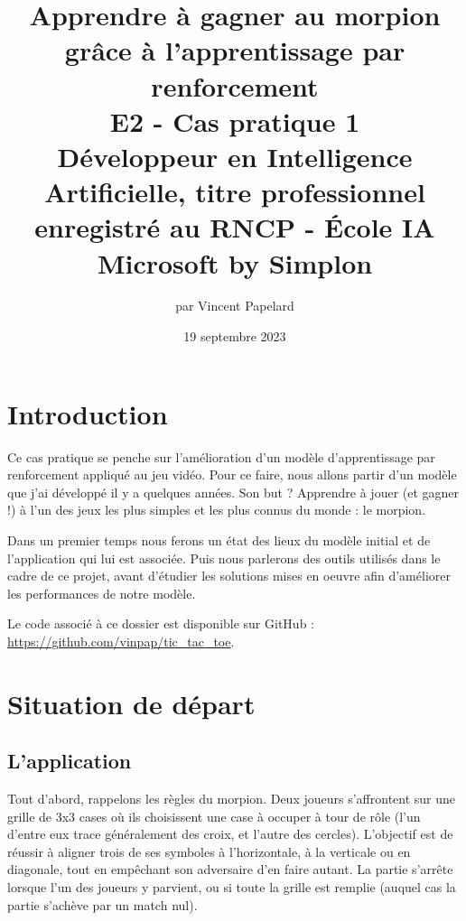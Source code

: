 \documentclass[french]{article}
\title{%
    \huge Apprendre à gagner au morpion grâce à l'apprentissage par renforcement  \\
    \bigskip
    \large E2 - Cas pratique 1 \\ 
    Développeur en Intelligence Artificielle,
    titre professionnel enregistré au RNCP - École IA Microsoft by Simplon}
\date{19 septembre 2023}
\author{par Vincent Papelard}
\begin{document}
    \maketitle
    \newpage
    \tableofcontents
    \newpage

    \section*{Introduction}
    Ce cas pratique se penche sur l'amélioration d'un modèle d'apprentissage par renforcement appliqué au jeu vidéo. Pour ce faire, nous allons partir d'un modèle que j'ai développé il y a quelques années. Son but ? Apprendre à jouer (et gagner !) à l'un des jeux les plus simples et les plus connus du monde : le morpion.
    
    Dans un premier temps nous ferons un état des lieux du modèle initial et de l'application qui lui est associée. Puis nous parlerons des outils utilisés dans le cadre de ce projet, avant d'étudier les solutions mises en oeuvre afin d'améliorer les performances de notre modèle.
    
    Le code associé à ce dossier est disponible sur GitHub : 
    \url{https://github.com/vinpap/tic_tac_toe}.

    \section{Situation de départ}
    \subsection{L'application}
    Tout d'abord, rappelons les règles du morpion. Deux joueurs s'affrontent sur une grille de 3x3 cases où ils choisissent une case à occuper à tour de rôle (l'un d'entre eux trace généralement des croix, et l'autre des cercles). L'objectif est de réussir à aligner trois de ses symboles à l'horizontale, à la verticale ou en diagonale, tout en empêchant son adversaire d'en faire autant. La partie s'arrête lorsque l'un des joueurs y parvient, ou si toute la grille est remplie (auquel cas la partie s'achève par un match nul). 
\end{document}
